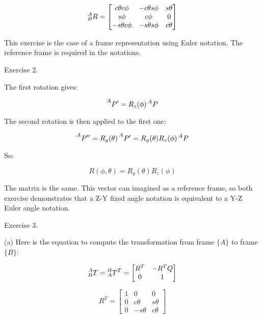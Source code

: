 \documentclass{article}
\begin{document}
\begin{equation}
  \prescript{A}{B}{R} = \begin{bmatrix}
                          c\theta c\phi  & -c\theta s\phi & s\theta \\
                          s\phi          & c\phi          & 0       \\
                          -s\theta c\phi & -s\theta s\phi & c\theta
                        \end{bmatrix}
\end{equation}

This exercise is the case of a frame representation using Euler notation. The reference frame is required in the notations.

Exercise 2.

The first rotation gives:

\begin{equation}
  \prescript{A}{}{P'} = R_{z}(\phi) \prescript{A}{}{P}
\end{equation}

The second rotation is then applied to the first one:

\begin{equation}
  \prescript{A}{}{P''} = R_{y}(\theta) \prescript{A}{}{P'} = R_{y}(\theta) R_{z}(\phi) \prescript{A}{}{P}
\end{equation}

So:

\begin{equation}
  R(\phi, \theta) = R_{y}(\theta) R_{z}(\phi)
\end{equation}

The matrix is the same. This vector can imagined as a reference frame, so both exercise demonstrates that a Z-Y fixed angle notation is equivalent to a Y-Z Euler angle notation.

Exercise 3.

(a) Here is the equation to compute the transformation from frame $\{A\}$ to frame $\{B\}$:

\begin{equation}
  \prescript{A}{B}{T} = \prescript{B}{A}{T}^{T} \\
  = \begin{bmatrix}
      R^{T} & -R^{T}Q \\
      0     & 1       
    \end{bmatrix}
\end{equation}

\begin{equation}
  R^{T} = \begin{bmatrix}
            1 & 0        & 0       \\
            0 & c\theta  & s\theta \\
	    0 & -s\theta & c\theta
	  \end{bmatrix}
\end{equation}
\end{document}
